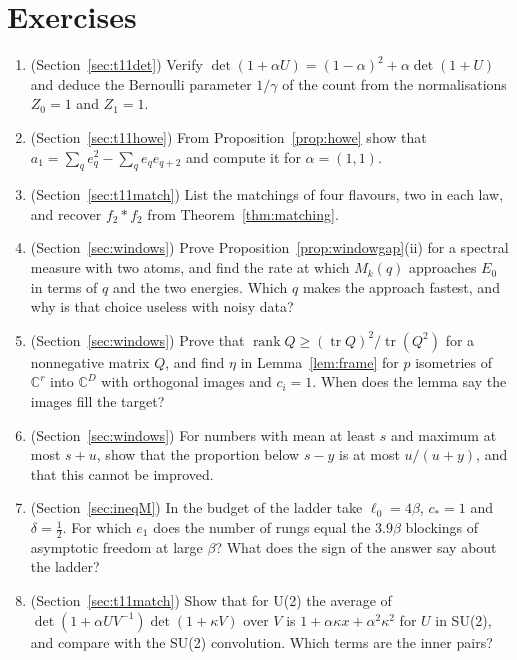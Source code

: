 \section*{Exercises}
\begin{enumerate}
\item (Section~\ref{sec:t11det}) Verify $\det(1+\alpha U)=(1-\alpha)^2+\alpha\det(1+U)$ and deduce the Bernoulli parameter $1/\gamma$ of the count from the normalisations $Z_0=1$ and $Z_1=1$.
\item (Section~\ref{sec:t11howe}) From Proposition~\ref{prop:howe} show that $a_1=\sum_qe_q^2-\sum_qe_qe_{q+2}$ and compute it for $\alpha=(1,1)$.
\item (Section~\ref{sec:t11match}) List the matchings of four flavours, two in each law, and recover $f_2*f_2$ from Theorem~\ref{thm:matching}.
\item (Section~\ref{sec:windows}) Prove Proposition~\ref{prop:windowgap}(ii) for a spectral measure with two atoms, and find the rate at which $M_k(q)$ approaches $E_0$ in terms of $q$ and the two energies. Which $q$ makes the approach fastest, and why is that choice useless with noisy data?
\item (Section~\ref{sec:windows}) Prove that $\operatorname{rank}Q\ge(\operatorname{tr}Q)^2/\operatorname{tr}(Q^2)$ for a nonnegative matrix $Q$, and find $\eta$ in Lemma~\ref{lem:frame} for $p$ isometries of $\mathbb C^r$ into $\mathbb C^D$ with orthogonal images and $c_i=1$. When does the lemma say the images fill the target?
\item (Section~\ref{sec:windows}) For numbers with mean at least $s$ and maximum at most $s+u$, show that the proportion below $s-y$ is at most $u/(u+y)$, and that this cannot be improved.
\item (Section~\ref{sec:ineqM}) In the budget of the ladder take $\ell_0=4\beta$, $c_*=1$ and $\delta=\frac12$. For which $e_1$ does the number of rungs equal the $3.9\beta$ blockings of asymptotic freedom at large $\beta$? What does the sign of the answer say about the ladder?
\item (Section~\ref{sec:t11match}) Show that for U(2) the average of $\det(1+\alpha UV^{-1})\det(1+\kappa V)$ over $V$ is $1+\alpha\kappa x+\alpha^2\kappa^2$ for $U$ in SU(2), and compare with the SU(2) convolution. Which terms are the inner pairs?
\end{enumerate}
